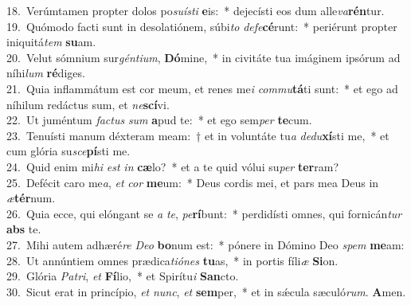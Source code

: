 {18.~}Verúmtamen propter dolos po\textit{su}\textit{í}\textit{sti} \textbf{e}is:~* dejecísti eos dum alle\textit{va}\textbf{rén}tur.\\
{19.~}Quómodo facti sunt in desolatiónem, súbi\textit{to} \textit{de}\textit{fe}\textbf{cé}runt:~* periérunt propter iniquitá\textit{tem} \textbf{su}am.\\
{20.~}Velut sómnium sur\textit{gén}\textit{ti}\textit{um}, \textbf{Dó}mine,~* in civitáte tua imáginem ipsórum ad níhi\textit{lum} \textbf{ré}diges.\\
{21.~}Quia inflammátum est cor meum, et renes me\textit{i} \textit{com}\textit{mu}\textbf{tá}ti sunt:~* et ego ad níhilum redáctus sum, et \textit{ne}\textbf{scí}vi.\\
{22.~}Ut juméntum \textit{fa}\textit{ctus} \textit{sum} \textbf{a}pud te:~* et ego sem\textit{per} \textbf{te}cum.\\
{23.~}Tenuísti manum déxteram meam:~† et in voluntáte tu\textit{a} \textit{de}\textit{du}\textbf{xí}sti me,~* et cum glória su\textit{sce}\textbf{pí}sti me.\\
{24.~}Quid enim mi\textit{hi} \textit{est} \textit{in} \textbf{cæ}lo?~* et a te quid vólui su\textit{per} \textbf{ter}ram?\\
{25.~}Defécit caro me\textit{a}, \textit{et} \textit{cor} \textbf{me}um:~* Deus cordis mei, et pars mea Deus in \textit{æ}\textbf{tér}num.\\
{26.~}Quia ecce, qui elóngant se \textit{a} \textit{te}, \textit{pe}\textbf{rí}bunt:~* perdidísti omnes, qui fornicán\textit{tur} \textbf{abs} te.\\
{27.~}Mihi autem adhæré\textit{re} \textit{De}\textit{o} \textbf{bo}num est:~* pónere in Dómino Deo \textit{spem} \textbf{me}am:\\
{28.~}Ut annúntiem omnes prædica\textit{ti}\textit{ó}\textit{nes} \textbf{tu}as,~* in portis fíli\textit{æ} \textbf{Si}on.\\
{29.~}Glória \textit{Pa}\textit{tri}, \textit{et} \textbf{Fí}lio,~* et Spirítu\textit{i} \textbf{San}cto.\\
{30.~}Sicut erat in princípio, \textit{et} \textit{nunc}, \textit{et} \textbf{sem}per,~* et in sǽcula sæculó\textit{rum}. \textbf{A}men.\\
